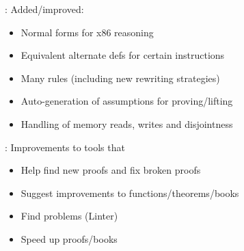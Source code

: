 \begin{frame}

\implibtitle

: Added/improved:
\begin{itemize}
\item Normal forms for x86 reasoning
\item Equivalent alternate defs for certain instructions
\item Many rules (including new rewriting strategies)
\item Auto-generation of assumptions for proving/lifting
\item Handling of memory reads, writes and disjointness
\end{itemize}

\end{frame}


\begin{frame}

\implibtitle

: Improvements to tools that
\begin{itemize}
\item Help find new proofs and fix broken proofs
\item Suggest improvements to functions/theorems/books
\item Find problems (Linter)
\item Speed up proofs/books
\end{itemize}

\end{frame}



